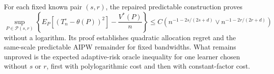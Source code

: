 For each fixed known pair \((s,r)\), the repaired predictable construction proves
\[
\sup_{P\in\mathcal P(s,r)}
\left\{E_P[(T_n^{\circ}-\theta(P))^2]-\frac{V^*(P)}n\right\}
\leq C\left(n^{-1-2s/(2s+d)}\vee n^{-1-2r/(2r+d)}\right)
\]
without a logarithm.  Its proof establishes quadratic allocation regret and the same-scale predictable AIPW remainder for fixed bandwidths.  What remains unproved is the expected adaptive-risk oracle inequality for one learner chosen without \(s\) or \(r\), first with polylogarithmic cost and then with constant-factor cost.